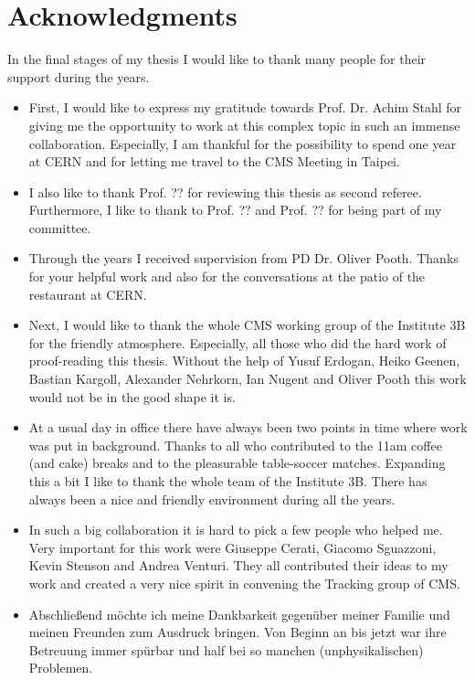 \chapter*{Acknowledgments}

In the final stages of my thesis I would like to thank many people for their support during the years.

\begin{itemize}

\item{} First, I would like to express my gratitude towards Prof. Dr. Achim Stahl for giving me the opportunity to work at this complex topic in such an immense collaboration. Especially, I am thankful for the possibility to spend one year at CERN and for letting me travel to the CMS Meeting in Taipei.

\item{} I also like to thank Prof. ?? for reviewing this thesis as second referee. Furthermore, I like to thank to Prof. ?? and Prof. ?? for being part of my committee.

\item{} Through the years I received supervision from PD Dr. Oliver Pooth. Thanks for your helpful work and also for the conversations at the patio of the restaurant at CERN.

\item{} Next, I would like to thank the whole CMS working group of the Institute 3B for the friendly atmosphere. Especially, all those who did the hard work of proof-reading this thesis. Without the help of Yusuf Erdogan, Heiko Geenen, Bastian Kargoll, Alexander Nehrkorn, Ian Nugent and Oliver Pooth this work would not be in the good shape it is.

\item{} At a usual day in office there have always been two points in time where work was put in background. Thanks to all who contributed to the 11am coffee (and cake) breaks and to the pleasurable table-soccer matches. Expanding this a bit I like to thank the whole team of the Institute 3B. There has always been a nice and friendly environment during all the years.

\item{} In such a big collaboration it is hard to pick a few people who helped me. Very important for this work were Giuseppe Cerati, Giacomo Sguazzoni, Kevin Stenson and Andrea Venturi. They all contributed their ideas to my work and created a very nice spirit in convening the Tracking group of CMS.



\item{} Abschlie\ss{}end m\"o{}chte ich meine Dankbarkeit gegen\"u{}ber meiner Familie und meinen Freunden zum Ausdruck bringen. Von Beginn an bis jetzt war ihre Betreuung immer sp\"u{}rbar und half bei so manchen (unphysikalischen) Problemen.

\end{itemize}



